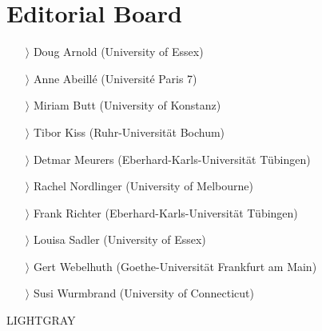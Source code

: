 \documentclass[
notumble,
nofoldmark,
]{leaflet}
\begin{document}
{    \section{Editorial Board}     
\begin{itemize}
    \item[$\rangle$] Doug Arnold (University of Essex)
    \item[$\rangle$] Anne Abeill\'e (Universit\'e Paris 7)
    \item[$\rangle$] Miriam Butt (University of Konstanz)
    \item[$\rangle$] Tibor Kiss (Ruhr-Universit\"at Bochum)
    \item[$\rangle$] Detmar Meurers (Eberhard-Karls-Universit\"at T\"ubingen)
    \item[$\rangle$] Rachel Nordlinger (University of Melbourne) 
    \item[$\rangle$] Frank Richter (Eberhard-Karls-Universit\"at T\"ubingen)
    \item[$\rangle$] Louisa Sadler (University of Essex)
    \item[$\rangle$] Gert Webelhuth (Goethe-Universit\"at Frankfurt am Main)
    \item[$\rangle$] Susi Wurmbrand (University of Connecticut)
    \end{itemize}
    }{LIGHTGRAY}
\end{document}
